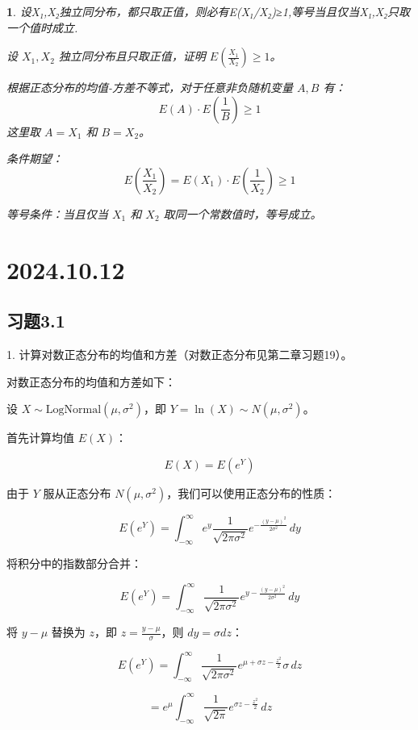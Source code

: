 \documentclass[UTF8]{report}
\theoremstyle{MyLineTheoremStyle} %
\theoremstyle{MyBlockTheoremStyle} %
\theoremstyle{MySubsubsectionStyle} %
\newtheorem{definition}{}
\begin{document}
\begin{definition}
设X₁,X₂独立同分布，都只取正值，则必有E(X₁/X₂)≥1,等号当且仅当X₁,X₂只取一个值时成立.

设 \( X_1, X_2 \) 独立同分布且只取正值，证明 \( E\left(\frac{X_1}{X_2}\right) \geq 1 \)。

根据正态分布的均值-方差不等式，对于任意非负随机变量 \( A, B \) 有：
   \[
   E(A) \cdot E\left(\frac{1}{B}\right) \geq 1
   \]
   这里取 \( A = X_1 \) 和 \( B = X_2 \)。

条件期望：
   \[
   E\left(\frac{X_1}{X_2}\right) = E(X_1) \cdot E\left(\frac{1}{X_2}\right) \geq 1
   \]

等号条件：当且仅当 \( X_1 \) 和 \( X_2 \) 取同一个常数值时，等号成立。
\end{definition}



\chapter{2024.10.12}\thispagestyle{fancy}

\section{习题3.1}

1. 计算对数正态分布的均值和方差（对数正态分布见第二章习题19）。

对数正态分布的均值和方差如下：

设 \(X \sim \text{LogNormal}(\mu, \sigma^2)\)，即 \(Y = \ln(X) \sim N(\mu, \sigma^2)\)。

首先计算均值 \(E(X)\)：

\[
E(X) = E(e^Y)
\]

由于 \(Y\) 服从正态分布 \(N(\mu, \sigma^2)\)，我们可以使用正态分布的性质：

\[
E(e^Y) = \int_{-\infty}^{\infty} e^y \frac{1}{\sqrt{2\pi\sigma^2}} e^{-\frac{(y-\mu)^2}{2\sigma^2}} \, dy
\]

将积分中的指数部分合并：

\[
E(e^Y) = \int_{-\infty}^{\infty} \frac{1}{\sqrt{2\pi\sigma^2}} e^{y - \frac{(y-\mu)^2}{2\sigma^2}} \, dy
\]

将 \(y - \mu\) 替换为 \(z\)，即 \(z = \frac{y - \mu}{\sigma}\)，则 \(dy = \sigma dz\)：

\[
E(e^Y) = \int_{-\infty}^{\infty} \frac{1}{\sqrt{2\pi\sigma^2}} e^{\mu + \sigma z - \frac{z^2}{2}} \sigma \, dz
\]

\[
= e^{\mu} \int_{-\infty}^{\infty} \frac{1}{\sqrt{2\pi}} e^{\sigma z - \frac{z^2}{2}} \, dz
\]
\end{document}
